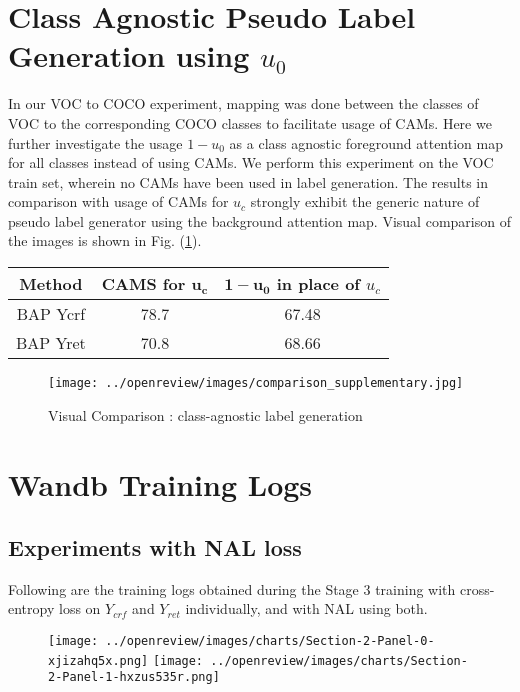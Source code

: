 \section{Class Agnostic Pseudo Label Generation using $u_0$}
In our VOC to COCO experiment, mapping was done between the classes of VOC to the corresponding COCO classes to facilitate usage of CAMs. Here we further investigate the usage $1-u_0$ as a class agnostic foreground attention map for all classes instead of using CAMs. We perform this experiment on the VOC train set, wherein no CAMs have been used in label generation. The results in comparison with usage of CAMs for $u_c$ strongly exhibit the generic nature of pseudo label generator using the background attention map. Visual comparison of the images is shown in Fig. (\ref{fig:bgattmap}).
\begin{table}[h]
\centering
\begin{tabular}{|c|c|c|}
\hline
\textbf{Method} & \textbf{CAMS for $\mathbf{u_c}$} & \textbf{$\mathbf{1-u_0}$ in place of $u_c$} \\ \hline
BAP Ycrf        & 78.7                  & 67.48                          \\
BAP Yret        & 70.8                  & 68.66                          \\ \hline
\end{tabular}
\label{tab:my-table1}
\end{table}

\begin{figure}[ht!]
\centering
\texttt{[image: ../openreview/images/comparison\_supplementary.jpg]}
\caption{\label{fig:bgattmap}{Visual Comparison : class-agnostic label generation}}
\end{figure}

\newpage
\section{Wandb Training Logs}
\subsection{Experiments with NAL loss}
Following are the training logs obtained during the Stage 3 training with cross-entropy loss on $Y_{crf}$ and $Y_{ret}$ individually, and with NAL using both. 
\begin{figure}[!htb]
\vspace{10mm}
\texttt{[image: ../openreview/images/charts/Section-2-Panel-0-xjizahq5x.png]}
\endminipage\hfill
{}
\texttt{[image: ../openreview/images/charts/Section-2-Panel-1-hxzus535r.png]}
\endminipage
\end{figure}

